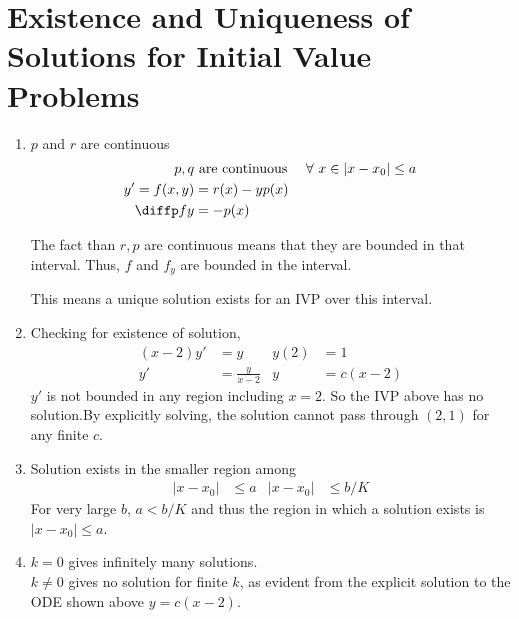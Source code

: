\section{Existence and Uniqueness of Solutions for Initial Value Problems}

\begin{enumerate}
    \item $ p $ and $ r $ are continuous
          \begin{align}
              p,q          & \text{ are continuous } &
              \forall\ x   & \in |x - x_{0}| \leq a    \\
              y' = f(x, y) & = r(x) - yp(x)            \\
              \diffp fy    & = -p(x)
          \end{align}

          The fact than $ r,p $ are continuous means that they are bounded in
          that interval.
          Thus, $ f $ and $ f_{y} $ are bounded in the interval.

          This means a unique solution exists for an IVP over this interval.

    \item Checking for existence of solution,
          \begin{align}
              (x-2)y' & = y             & y(2) & = 1      \\
              y'      & = \frac{y}{x-2} & y    & = c(x-2)
          \end{align}
          $ y' $ is not bounded in any region including $ x = 2 $. So the IVP above has
          no solution.By explicitly solving, the solution cannot pass through
          $ (2, 1) $ for any finite $ c $.

    \item Solution exists in the smaller region among
          \begin{align}
              |x - x_{0}| & \leq a & |x - x_{0}| & \leq b/K
          \end{align}
          For very large $ b $, $ a < b/K $ and thus the region in which a solution
          exists is $ |x - x_{0}| \leq a $.

    \item $ k = 0 $ gives infinitely many solutions. \\
          $ k \neq 0 $ gives no solution for finite $ k $, as evident from the explicit
          solution to the ODE shown above $ y = c(x-2) $.


\end{enumerate}
